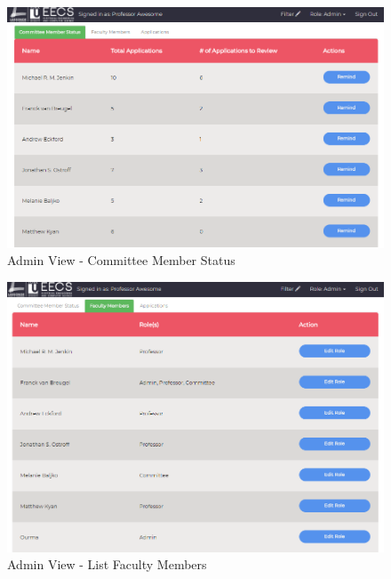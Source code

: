 \documentclass[fontsize=12pt,paper=letter,twoside]{scrartcl}
\begin{document}
\begin{figure}[!htb]
\begin{center}
\includegraphics[width=.78\textwidth]{images/admin_view1.png}
\end{center}
\caption{Admin View - Committee Member Status}
\label{fig:admin_view1}
\end{figure}

\begin{figure}[!htb]
\begin{center}
\includegraphics[width=.78\textwidth]{images/admin_view2.png}
\end{center}
\caption{Admin View - List Faculty Members}
\label{fig:admin_view2}
\end{figure}
\end{document}
